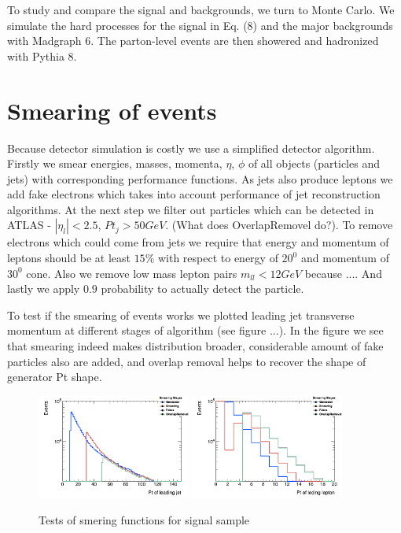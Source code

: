 \documentclass[tightenline,notitlepage,nofootinbib]{revtex4-1}
\begin{document}
To study and compare the signal and backgrounds, we turn to Monte Carlo. We simulate the hard processes
for the signal in Eq. (8) and the major backgrounds with Madgraph 6. The parton-level events are then showered and hadronized with Pythia 8. 

\section{Smearing of events}

Because detector simulation is costly we use a simplified detector algorithm. Firstly we smear energies, masses, momenta, $\eta$, $\phi$ of all objects (particles and jets) with corresponding performance functions. As jets also produce leptons we add fake electrons which takes into account performance of jet reconstruction algorithms. At the next step we filter out particles which can be detected in ATLAS - $|\eta_l|<2.5$, $Pt_j>50 GeV$. (What does OverlapRemovel do?). To remove electrons which could come from jets we require that energy and momentum of leptons should be at least $15\%$ with respect to energy of $20^0$ and momentum of $30^0$ cone. Also we remove low mass lepton pairs $m_{ll}<12 GeV$ because .... And lastly we apply $0.9$ probability to actually detect the particle.

To test if the smearing of events works we plotted leading jet transverse momentum at different stages of algorithm (see figure ...). In the figure we see that smearing indeed makes distribution broader, considerable amount of fake particles also are added, and overlap removal helps to recover the shape of generator Pt shape. 
\begin{figure}[!ht]
  \centering
  \includegraphics[width=0.45\textwidth]{h_PtJets1stStages.png}
  \includegraphics[width=0.45\textwidth]{h_PtEleMuo1stStages.png}
  \caption{Tests of smering functions for signal sample}
\end{figure}
\end{document}
